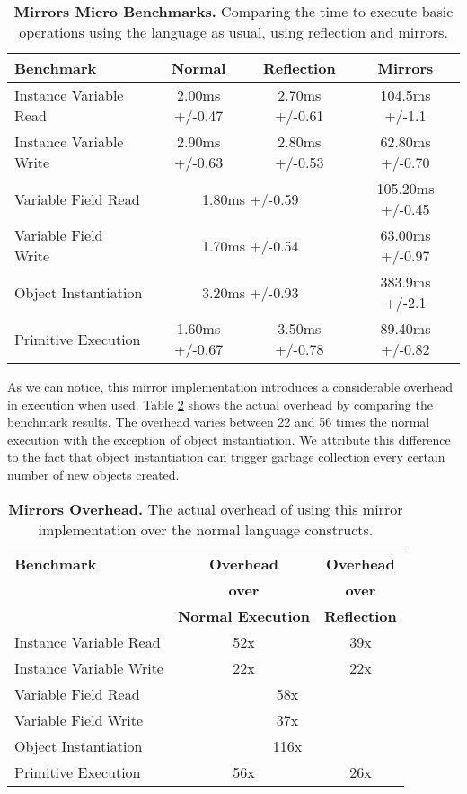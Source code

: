 \begin{table}[ht]
 	\centering
 	\begin{tabular}{lccc}%
			\toprule
			\textbf{Benchmark}
			& \textbf{Normal}
 			& \textbf{Reflection}
			& \textbf{Mirrors}\\
		\midrule
		Instance Variable Read & 2.00ms +/-0.47 & 2.70ms +/-0.61 & 104.5ms +/-1.1 \\\midrule
		Instance Variable Write & 2.90ms +/-0.63 & 2.80ms +/-0.53 & 62.80ms +/-0.70 \\\midrule
		Variable Field Read &  \multicolumn{2}{c}{1.80ms +/-0.59}  & 105.20ms +/-0.45 \\\midrule
		Variable Field Write & \multicolumn{2}{c}{1.70ms +/-0.54}  & 63.00ms +/-0.97 \\\midrule
		Object Instantiation &  \multicolumn{2}{c}{3.20ms +/-0.93}  & 383.9ms +/-2.1 \\\midrule
		Primitive Execution & 1.60ms +/-0.67 & 3.50ms +/-0.78 & 89.40ms +/-0.82 \\\midrule
 	\end{tabular}
	\vspace*{0.2cm}
 	\caption{\textbf{Mirrors Micro Benchmarks.} Comparing the time to execute basic operations using the language as usual, using reflection and \Vtt mirrors.\label{tb:benchmarks}}
 \end{table}

As we can notice, this mirror implementation introduces a considerable overhead in execution when used. Table \ref{tb:benchmarks_percentages} shows the actual overhead by comparing the benchmark results. The overhead varies between 22 and 56 times the normal execution with the exception of object instantiation. We attribute this difference to the fact that object instantiation can trigger garbage collection every certain number of new objects created.

\begin{table}[ht]
 	\centering
 	\begin{tabular}{lcc}
			\toprule
			\textbf{Benchmark}
			& \textbf{Overhead}
 			& \textbf{Overhead}\\
		&\textbf{over}&\textbf{over}\\
		&\textbf{Normal Execution}&\textbf{Reflection}\\
		\midrule
		Instance Variable Read & 52x & 39x \\\midrule
		Instance Variable Write & 22x & 22x \\\midrule
		Variable Field Read &  \multicolumn{2}{c}{58x} \\\midrule
		Variable Field Write & \multicolumn{2}{c}{37x} \\\midrule
		Object Instantiation &  \multicolumn{2}{c}{116x} \\\midrule
		Primitive Execution & 56x & 26x \\\midrule
 	\end{tabular}
	\vspace*{0.2cm}
 	\caption{\textbf{Mirrors Overhead.} The actual overhead of using this mirror implementation over the normal language constructs.\label{tb:benchmarks_percentages}}
 \end{table}


